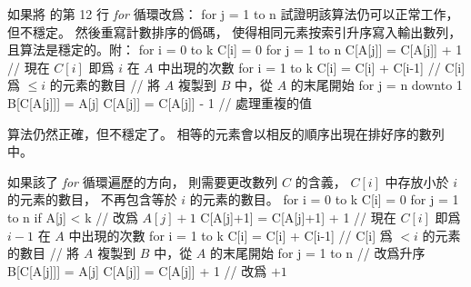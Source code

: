 \startEXERCISE
如果將  的第 12 行 \emph{for} 循環改爲：
\startCLRSCODE[start=12]
for j = 1 to n
\stopCLRSCODE
試證明該算法仍可以正常工作，但不穩定。
然後重寫計數排序的僞碼，
使得相同元素按索引升序寫入輸出數列，
且算法是穩定的。附：
\startCLRSCODE
{}
for i = 0 to k
	C[i] = 0
for j = 1 to n
	C[A[j]] = C[A[j]] + 1
// 現在 $C[i]$ 即爲 $i$ 在 $A$ 中出現的次數
for i = 1 to k
	C[i] = C[i] + C[i-1]
// C[i] 爲 $\le i$ 的元素的數目
// 將 $A$ 複製到 $B$ 中，從 $A$ 的末尾開始
for j = n downto 1
	B[C[A[j]]] = A[j]
	C[A[j]] = C[A[j]] - 1	// 處理重複的值
\stopCLRSCODE
\stopEXERCISE

\startANSWER
算法仍然正確，但不穩定了。
相等的元素會以相反的順序出現在排好序的數列中。

如果該了 \emph{for} 循環遍歷的方向，
則需要更改數列 $C$ 的含義，
 $C[i]$ 中存放小於 $i$ 的元素的數目，
 不再包含等於 $i$ 的元素的數目。
\startCLRSCODE
{}
for i = 0 to k
	C[i] = 0
for j = 1 to n
	if A[j] < k		// 改爲 $A[j]+1$
		C[A[j]+1] = C[A[j]+1] + 1
// 現在 $C[i]$ 即爲 $i-1$ 在 $A$ 中出現的次數
for i = 1 to k
	C[i] = C[i] + C[i-1]
// C[i] 爲 $< i$ 的元素的數目
// 將 $A$ 複製到 $B$ 中，從 $A$ 的末尾開始
for j = 1 to n		// 改爲升序
	B[C[A[j]]] = A[j]
	C[A[j]] = C[A[j]] + 1	// 改爲 $+1$
\stopCLRSCODE
\stopANSWER

